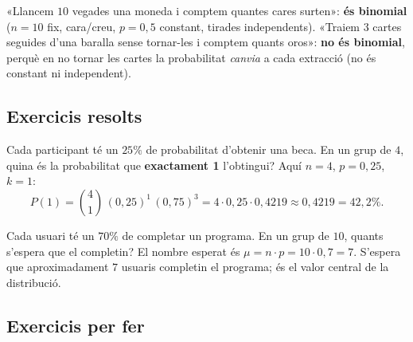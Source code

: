 \begin{exemple}
«Llancem $10$ vegades una moneda i comptem quantes cares surten»: \textbf{és binomial}
($n=10$ fix, cara/creu, $p=0,5$ constant, tirades independents). «Traiem $3$ cartes
seguides d'una baralla sense tornar-les i comptem quants oros»: \textbf{no és binomial},
perquè en no tornar les cartes la probabilitat \emph{canvia} a cada extracció (no és
constant ni independent).
\end{exemple}

\subsection{Exercicis resolts}

\begin{exresolt}
Cada participant té un $25\%$ de probabilitat d'obtenir una beca. En un grup de $4$, quina
és la probabilitat que \textbf{exactament 1} l'obtingui?
\solucio
Aquí $n=4$, $p=0,25$, $k=1$:
\[
P(1)=\binom{4}{1}\,(0,25)^{1}\,(0,75)^{3}=4\cdot 0,25\cdot 0,4219\approx 0,4219=42,2\%.
\]
\end{exresolt}

\begin{exresolt}
Cada usuari té un $70\%$ de completar un programa. En un grup de $10$, quants s'espera que
el completin?
\solucio
El nombre esperat és $\mu=n\cdot p=10\cdot 0,7=7$. S'espera que aproximadament $7$ usuaris
completin el programa; és el valor central de la distribució.
\end{exresolt}

\subsection{Exercicis per fer}

